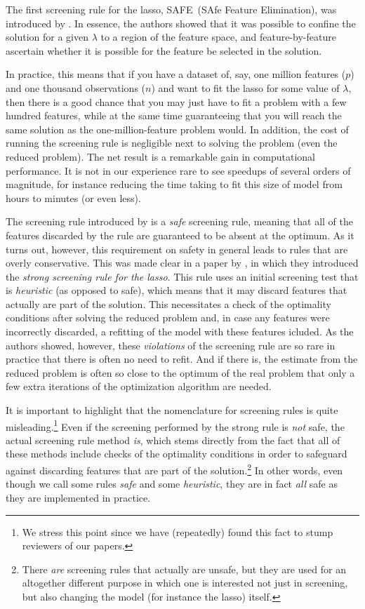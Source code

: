 The first screening rule for the lasso, SAFE~(SAfe Feature Elimination), was introduced by \textcite{elghaoui2010}. In essence, the authors showed that it was possible to confine the solution for a given \(\lambda\) to a region of the feature space, and feature-by-feature ascertain whether it is possible for the feature be selected in the solution.

In practice, this means that if you have a dataset of, say, one million features (\(p\)) and one thousand observations (\(n\)) and want to fit the lasso for some value of \(\lambda\), then there is a good chance that you may just have to fit a problem with a few hundred features, while at the same time guaranteeing that you will reach the same solution as the one-million-feature problem would. In addition, the cost of running the screening rule is negligible next to solving the problem (even the reduced problem). The net result is a remarkable gain in computational performance. It is not in our experience rare to see speedups of several orders of magnitude, for instance reducing the time taking to fit this size of model from hours to minutes (or even less).

The screening rule introduced by \textcite{elghaoui2010} is a \emph{safe} screening rule, meaning that all of the features discarded by the rule are guaranteed to be absent at the optimum. As it turns out, however, this requirement on safety in general leads to rules that are overly conservative. This was made clear in a paper by \textcite{tibshirani2012}, in which they introduced the \emph{strong screening rule for the lasso}. This rule uses an initial screening test that is \emph{heuristic} (as opposed to safe), which means that it may discard features that actually are part of the solution. This necessitates a check of the optimality conditions after solving the reduced problem and, in case any features were incorrectly discarded, a refitting of the model with these features icluded. As the authors showed, however, these \emph{violations} of the screening rule are so rare in practice that there is often no need to refit. And if there is, the estimate from the reduced problem is often so close to the optimum of the real problem that only a few extra iterations of the optimization algorithm are needed.

It is important to highlight that the nomenclature for screening rules is quite misleading.\footnote{We stress this point since we have (repeatedly) found this fact to stump reviewers of our papers.} Even if the screening performed by the strong rule is \emph{not} safe, the actual screening rule method \emph{is}, which stems directly from the fact that all of these methods include checks of the optimality conditions in order to safeguard against discarding features that are part of the solution.\footnote{There \emph{are} screening rules that actually are unsafe, but they are used for an altogether different purpose in which one is interested not just in screening, but also changing the model (for instance the lasso) itself.} In other words, even though we call some rules \emph{safe} and some \emph{heuristic}, they are in fact \emph{all} safe as they are implemented in practice.

